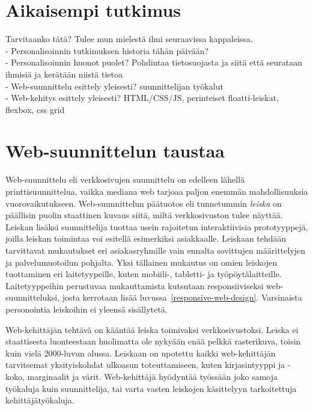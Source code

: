 \documentclass[finnish, 12pt, a4paper, elec, utf8, a-1b, online]{aaltothesis}
\begin{document}
\clearpage

\section{Aikaisempi tutkimus}

Tarvitaanko tätä? Tulee mun mielestä ilmi seuraavissa kappaleissa.
\\
- Personalisoinnin tutkimuksen historia tähän päivään?
\\
- Personalisoinnin huonot puolet? Pohdintaa tietosuojasta ja siitä että
seurataan ihmisiä ja kerätään niistä tietoa
\\
- Web-suunnittelu esittely yleisesti? suunnittelijan työkalut
\\
- Web-kehitys esittely yleisesti? HTML/CSS/JS, perinteiset floatti-leiskat, flexbox, css grid
\\

\clearpage

\section{Web-suunnittelun taustaa}

Web-suunnittelu eli verkkosivujen suunnittelu on edelleen lähellä
printtisuunnittelua, vaikka mediana web tarjoaa paljon enemmän mahdollisuuksia
vuorovaikutukseen. Web-suunnittelun päätuotos eli tunnetummin \textit{leiska} on
päällisin puolin staattinen kuvaus siitä, miltä verkkosivuston tulee näyttää.
Leiskan lisäksi suunnittelija tuottaa usein rajoitetun interaktiivisia
prototyyppejä, joilla leiskan toimintaa voi esitellä esimerkiksi asiakkaalle.
Leiskaan tehdään tarvittavat mukautukset eri asiakasryhmille vain ennalta
sovittujen määrittelyjen ja palvelumuotoilun pohjalta. Yksi tällainen mukautus
on omien leiskojen tuottaminen eri laitetyypeille, kuten mobiili-, tabletti- ja
työpöytälaitteille. Laitetyyppeihin perustuvaa mukauttamista kutsutaan
responsiiviseksi web-suunnitteluksi, josta kerrotaan lisää
luvussa~\ref{responsive-web-design}. Varsinaista personointia leiskoihin ei
yleensä sisällytetä.

Web-kehittäjän tehtävä on kääntää leiska toimivaksi verkkosivustoksi. Leiska ei
staattisesta luonteestaan huolimatta ole nykyään enää pelkkä rasterikuva, toisin
kuin vielä 2000-luvun alussa. Leiskaan on upotettu kaikki web-kehittäjän
tarvitsemat yksityiskohdat ulkoasun toteuttamiseen, kuten kirjasintyyppi ja
-koko, marginaalit ja värit. Web-kehittäjä hyödyntää työssään joko samoja
työkaluja kuin suunnittelija, tai varta vasten leiskojen käsittelyyn
tarkoitettuja kehittäjätyökaluja.
\end{document}

